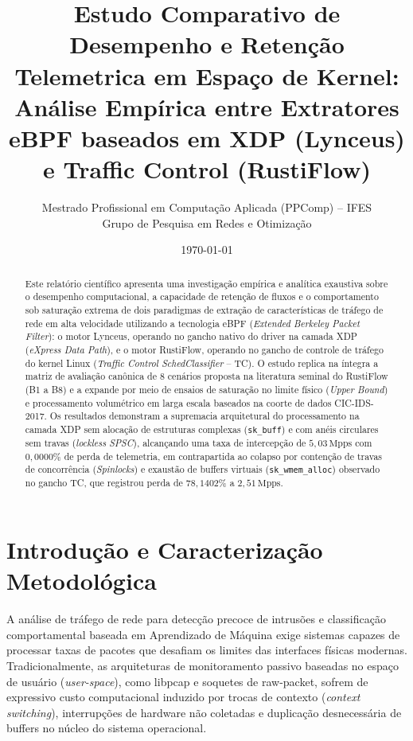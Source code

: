 \documentclass[11pt,a4paper]{article}
\title{\textbf{Estudo Comparativo de Desempenho e Retenção Telemetrica em Espaço de Kernel: Análise Empírica entre Extratores eBPF baseados em XDP (Lynceus) e Traffic Control (RustiFlow)}}
\author{Mestrado Profissional em Computação Aplicada (PPComp) -- IFES \\ Grupo de Pesquisa em Redes e Otimização}
\date{\today}
\begin{document}
\maketitle

\begin{abstract}
Este relatório científico apresenta uma investigação empírica e analítica exaustiva sobre o desempenho computacional, a capacidade de retenção de fluxos e o comportamento sob saturação extrema de dois paradigmas de extração de características de tráfego de rede em alta velocidade utilizando a tecnologia eBPF (\textit{Extended Berkeley Packet Filter}): o motor Lynceus, operando no gancho nativo do driver na camada XDP (\textit{eXpress Data Path}), e o motor RustiFlow, operando no gancho de controle de tráfego do kernel Linux (\textit{Traffic Control SchedClassifier} -- TC). O estudo replica na íntegra a matriz de avaliação canônica de 8 cenários proposta na literatura seminal do RustiFlow (B1 a B8) e a expande por meio de ensaios de saturação no limite físico (\textit{Upper Bound}) e processamento volumétrico em larga escala baseados na coorte de dados CIC-IDS-2017. Os resultados demonstram a supremacia arquitetural do processamento na camada XDP sem alocação de estruturas complexas (\texttt{sk\_buff}) e com anéis circulares sem travas (\textit{lockless SPSC}), alcançando uma taxa de intercepção de $5,03\,\text{Mpps}$ com $0,0000\%$ de perda de telemetria, em contrapartida ao colapso por contenção de travas de concorrência (\textit{Spinlocks}) e exaustão de buffers virtuais (\texttt{sk\_wmem\_alloc}) observado no gancho TC, que registrou perda de $78,1402\%$ a $2,51\,\text{Mpps}$.
\end{abstract}

\tableofcontents
\newpage

\section{Introdução e Caracterização Metodológica}
A análise de tráfego de rede para detecção precoce de intrusões e classificação comportamental baseada em Aprendizado de Máquina exige sistemas capazes de processar taxas de pacotes que desafiam os limites das interfaces físicas modernas. Tradicionalmente, as arquiteturas de monitoramento passivo baseadas no espaço de usuário (\textit{user-space}), como libpcap e soquetes de raw-packet, sofrem de expressivo custo computacional induzido por trocas de contexto (\textit{context switching}), interrupções de hardware não coletadas e duplicação desnecessária de buffers no núcleo do sistema operacional.
\end{document}
